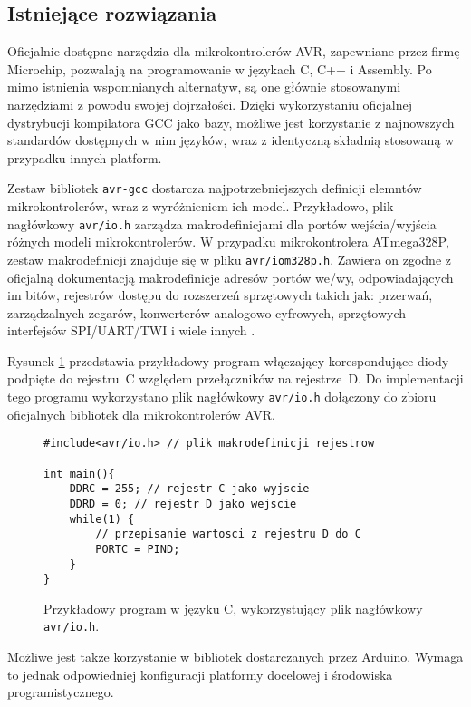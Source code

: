 \subsection{Istniejące rozwiązania}
Oficjalnie dostępne narzędzia dla mikrokontrolerów AVR, zapewniane przez firmę Microchip, pozwalają na programowanie w językach C, C++ i Assembly. Po mimo istnienia wspomnianych alternatyw, są one głównie stosowanymi narzędziami z powodu swojej dojrzałości.
Dzięki wykorzystaniu oficjalnej dystrybucji kompilatora GCC jako bazy, możliwe jest korzystanie z najnowszych standardów dostępnych w nim języków, wraz z identyczną składnią stosowaną w przypadku innych platform.

Zestaw bibliotek \lstinline|avr-gcc| dostarcza najpotrzebniejszych definicji elemntów mikrokontrolerów, wraz z wyróżnieniem ich model. Przykładowo, plik nagłówkowy \lstinline|avr/io.h| zarządza makrodefinicjami dla portów wejścia/wyjścia różnych modeli mikrokontrolerów. W przypadku mikrokontrolera ATmega328P, zestaw makrodefinicji znajduje się w pliku \lstinline|avr/iom328p.h|. Zawiera on zgodne z oficjalną dokumentacją makrodefinicje adresów portów we/wy, odpowiadających im bitów, rejestrów dostępu do rozszerzeń sprzętowych takich jak: przerwań, zarządzalnych zegarów, konwerterów analogowo-cyfrowych, sprzętowych interfejsów SPI/UART/TWI i wiele innych \cite{ATmega328P8bitAVR}.

Rysunek \ref{fig:lst:c-example} przedstawia przykładowy program włączający korespondujące diody podpięte do rejestru~C względem przełączników na rejestrze~D. Do implementacji tego programu wykorzystano plik nagłówkowy \lstinline|avr/io.h| dołączony do zbioru oficjalnych bibliotek dla mikrokontrolerów AVR.
\begin{figure}
\centering
\begin{lstlisting}
#include<avr/io.h> // plik makrodefinicji rejestrow

int main(){
	DDRC = 255; // rejestr C jako wyjscie
	DDRD = 0; // rejestr D jako wejscie
	while(1) {
		// przepisanie wartosci z rejestru D do C
		PORTC = PIND;
	}
}
\end{lstlisting}
\caption{Przykładowy program w języku C, wykorzystujący plik nagłówkowy \lstinline|avr/io.h|.}
\label{fig:lst:c-example}
\end{figure}

Możliwe jest także korzystanie w bibliotek dostarczanych przez Arduino. Wymaga to jednak odpowiedniej konfiguracji platformy docelowej i środowiska programistycznego.

